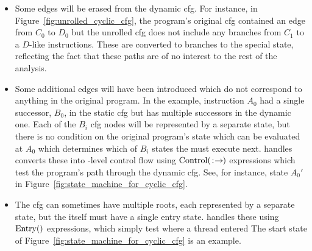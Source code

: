 \begin{itemize}
\item
  Some edges will be erased from the dynamic \gls{cfg}.  For instance,
  in Figure~\ref{fig:unrolled_cyclic_cfg}, the program's original
  \gls{cfg} contained an edge from $C_0$ to $D_0$ but the unrolled
  \gls{cfg} does not include any branches from $C_1$ to a $D$-like
  instructions.  These are converted to branches to the special
  {\stUnreached} state, reflecting the fact that these paths are of no
  interest to the rest of the analysis.

\item
  Some additional edges will have been introduced which do not
  correspond to anything in the original program.  In the example,
  instruction $A_0$ had a single successor, $B_0$, in the static
  \gls{cfg} but has multiple successors in the dynamic one.  Each of
  the $B_i$ \gls{cfg} nodes will be represented by a separate
  {\StateMachine} state, but there is no condition on the original
  program's state which can be evaluated at $A_0$ which determines
  which of $B_i$ states the {\StateMachine} must execute next.
  {\Technique} handles converts these
into {\StateMachine}-level
  control flow using $\mathrm{Control}(\mathrm{}\!:\!\mathrm{\!}\!\rightarrow\!\mathrm{\!})$ expressions which test
  the program's path through the dynamic \gls{cfg}.  See, for
  instance, state $A_0'$ in
  Figure~\ref{fig:state_machine_for_cyclic_cfg}.

\item
  The \gls{cfg} can sometimes have multiple roots, each represented by
  a separate {\StateMachine} state, but the {\StateMachine} itself
  must have a single entry state.  {\Technique} handles these using
  $\mathrm{Entry}()$ expressions, which simply test where a thread entered
  The start state of Figure~\ref{fig:state_machine_for_cyclic_cfg} is
  an example.

\end{itemize}

